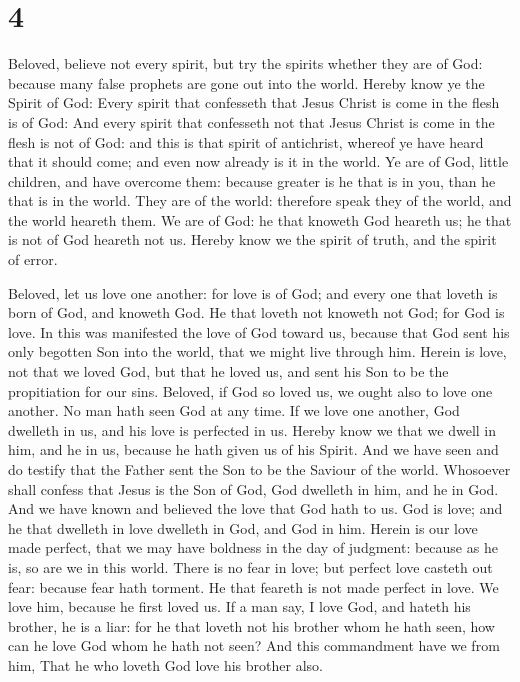 \hypertarget{section-3}{%
\section{4}\label{section-3}}

 Beloved, believe not every spirit, but try the spirits
whether they are of God: because many false prophets are gone out into
the world.  Hereby know ye the Spirit of God: Every spirit
that confesseth that Jesus Christ is come in the flesh is of God:
 And every spirit that confesseth not that Jesus Christ is
come in the flesh is not of God: and this is that spirit of antichrist,
whereof ye have heard that it should come; and even now already is it in
the world.  Ye are of God, little children, and have
overcome them: because greater is he that is in you, than he that is in
the world.  They are of the world: therefore speak they of
the world, and the world heareth them.  We are of God: he
that knoweth God heareth us; he that is not of God heareth not us.
Hereby know we the spirit of truth, and the spirit of error.

 Beloved, let us love one another: for love is of God; and
every one that loveth is born of God, and knoweth God.  He
that loveth not knoweth not God; for God is love.  In this
was manifested the love of God toward us, because that God sent his only
begotten Son into the world, that we might live through him.
 Herein is love, not that we loved God, but that he loved
us, and sent his Son to be the propitiation for our sins. 
Beloved, if God so loved us, we ought also to love one another.
 No man hath seen God at any time. If we love one another,
God dwelleth in us, and his love is perfected in us. 
Hereby know we that we dwell in him, and he in us, because he hath given
us of his Spirit.  And we have seen and do testify that the
Father sent the Son to be the Saviour of the world. 
Whosoever shall confess that Jesus is the Son of God, God dwelleth in
him, and he in God.  And we have known and believed the
love that God hath to us. God is love; and he that dwelleth in love
dwelleth in God, and God in him.  Herein is our love made
perfect, that we may have boldness in the day of judgment: because as he
is, so are we in this world.  There is no fear in love; but
perfect love casteth out fear: because fear hath torment. He that
feareth is not made perfect in love.  We love him, because
he first loved us.  If a man say, I love God, and hateth
his brother, he is a liar: for he that loveth not his brother whom he
hath seen, how can he love God whom he hath not seen?  And
this commandment have we from him, That he who loveth God love his
brother also.

